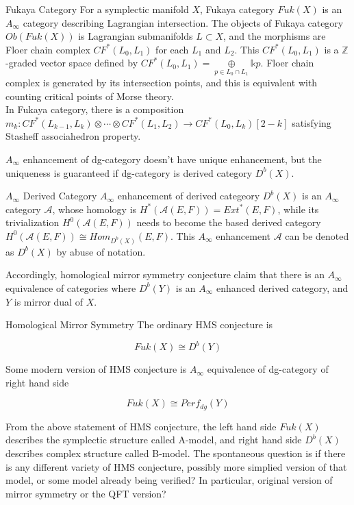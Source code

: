 \documentclass{article}
\begin{document}
\begin{definition}{Fukaya Category}{}
For a symplectic manifold $X$, Fukaya category $Fuk(X)$ is an $A_\infty$ category describing Lagrangian intersection.
The objects of Fukaya category $Ob(Fuk(X))$ is Lagrangian submanifolds $L\subset X$, 
and the morphisms are Floer chain complex $CF^*(L_0,L_1)$ for each $L_1$ and $L_2$.
This $CF^*(L_0,L_1)$ is a $\mathbb{Z}$-graded vector space defined by $CF^*(L_0,L_1) = \underset{p\in L_0\cap L_1}{\oplus} \mathbb{k} p$.
Floer chain complex is generated by its intersection points, and this is equivalent with counting critical points of Morse theory. \\

In Fukaya category, there is a composition $m_k: CF^*(L_{k-1},L_k)\otimes \cdots \otimes CF^*(L_1,L_2) \to CF^*(L_0,L_k)[2-k]$
satisfying Stasheff associahedron property.
\end{definition}


$A_\infty$ enhancement of dg-category doesn't have unique enhancement, 
but the uniqueness is guaranteed if dg-category is derived category $D^b(X)$.

\begin{definition}{$A_\infty$ Derived Category}{}
$A_\infty$ enhancement of derived categeory $D^b(X)$ is an $A_\infty$ category $\mathcal{A}$,
whose homology is $H^*(\mathcal{A}(E,F))=Ext^*(E,F)$, 
while its trivialization $H^0(\mathcal{A}(E,F))$ needs to become the based derived category $H^0(\mathcal{A}(E,F)) \cong Hom_{D^b(X)}(E,F)$.
This $A_\infty$ enhancement $\mathcal{A}$ can be denoted as $D^b(X)$ by abuse of notation.
\end{definition}


Accordingly, homological mirror symmetry conjecture claim that there is an $A_\infty$ equivalence of categories 
where $D^b(Y)$ is an $A_\infty$ enhanced derived category, and $Y$ is mirror dual of $X$.

\begin{conjecture}{Homological Mirror Symmetry}{}
The ordinary HMS conjecture is

\[
Fuk(X) \cong D^b(Y)
\]

Some modern version of HMS conjecture is $A_\infty$ equivalence of dg-category of right hand side

\[
Fuk(X) \cong Perf_{dg}(Y)
\]
\end{conjecture}


From the above statement of HMS conjecture, the left hand side $Fuk(X)$ describes the symplectic structure called A-model,
and right hand side $D^b(X)$ describes complex structure called B-model.
The spontaneous question is if there is any different variety of HMS conjecture,
possibly more simplied version of that model, or some model already being verified? 
In particular, original version of mirror symmetry or the QFT version?  \\
\end{document}
